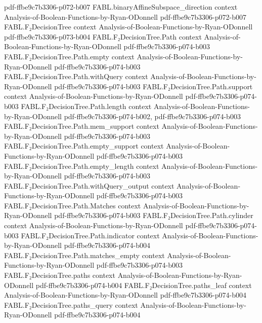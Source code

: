 \begin{theorem}
  {pdf-ffbe9c7b3306-p072-b007}
\proofstep
  {FABL.binaryAffineSubspace_direction}
  {context}
  {Analysis-of-Boolean-Functions-by-Ryan-ODonnell}
  {pdf-ffbe9c7b3306-p072-b007}
\proofstep
  {FABL.F₂DecisionTree}
  {context}
  {Analysis-of-Boolean-Functions-by-Ryan-ODonnell}
  {pdf-ffbe9c7b3306-p073-b004}
\proofstep
  {FABL.F₂DecisionTree.Path}
  {context}
  {Analysis-of-Boolean-Functions-by-Ryan-ODonnell}
  {pdf-ffbe9c7b3306-p074-b003}
\proofstep
  {FABL.F₂DecisionTree.Path.empty}
  {context}
  {Analysis-of-Boolean-Functions-by-Ryan-ODonnell}
  {pdf-ffbe9c7b3306-p074-b003}
\proofstep
  {FABL.F₂DecisionTree.Path.withQuery}
  {context}
  {Analysis-of-Boolean-Functions-by-Ryan-ODonnell}
  {pdf-ffbe9c7b3306-p074-b003}
\proofstep
  {FABL.F₂DecisionTree.Path.support}
  {context}
  {Analysis-of-Boolean-Functions-by-Ryan-ODonnell}
  {pdf-ffbe9c7b3306-p074-b003}
\proofstep
  {FABL.F₂DecisionTree.Path.length}
  {context}
  {Analysis-of-Boolean-Functions-by-Ryan-ODonnell}
  {pdf-ffbe9c7b3306-p074-b002,
    pdf-ffbe9c7b3306-p074-b003}
\proofstep
  {FABL.F₂DecisionTree.Path.mem_support}
  {context}
  {Analysis-of-Boolean-Functions-by-Ryan-ODonnell}
  {pdf-ffbe9c7b3306-p074-b003}
\proofstep
  {FABL.F₂DecisionTree.Path.empty_support}
  {context}
  {Analysis-of-Boolean-Functions-by-Ryan-ODonnell}
  {pdf-ffbe9c7b3306-p074-b003}
\proofstep
  {FABL.F₂DecisionTree.Path.empty_length}
  {context}
  {Analysis-of-Boolean-Functions-by-Ryan-ODonnell}
  {pdf-ffbe9c7b3306-p074-b003}
\proofstep
  {FABL.F₂DecisionTree.Path.withQuery_output}
  {context}
  {Analysis-of-Boolean-Functions-by-Ryan-ODonnell}
  {pdf-ffbe9c7b3306-p074-b003}
\proofstep
  {FABL.F₂DecisionTree.Path.Matches}
  {context}
  {Analysis-of-Boolean-Functions-by-Ryan-ODonnell}
  {pdf-ffbe9c7b3306-p074-b003}
\proofstep
  {FABL.F₂DecisionTree.Path.cylinder}
  {context}
  {Analysis-of-Boolean-Functions-by-Ryan-ODonnell}
  {pdf-ffbe9c7b3306-p074-b003}
\proofstep
  {FABL.F₂DecisionTree.Path.indicator}
  {context}
  {Analysis-of-Boolean-Functions-by-Ryan-ODonnell}
  {pdf-ffbe9c7b3306-p074-b004}
\proofstep
  {FABL.F₂DecisionTree.Path.matches_empty}
  {context}
  {Analysis-of-Boolean-Functions-by-Ryan-ODonnell}
  {pdf-ffbe9c7b3306-p074-b003}
\proofstep
  {FABL.F₂DecisionTree.paths}
  {context}
  {Analysis-of-Boolean-Functions-by-Ryan-ODonnell}
  {pdf-ffbe9c7b3306-p074-b004}
\proofstep
  {FABL.F₂DecisionTree.paths_leaf}
  {context}
  {Analysis-of-Boolean-Functions-by-Ryan-ODonnell}
  {pdf-ffbe9c7b3306-p074-b004}
\proofstep
  {FABL.F₂DecisionTree.paths_query}
  {context}
  {Analysis-of-Boolean-Functions-by-Ryan-ODonnell}
  {pdf-ffbe9c7b3306-p074-b004}

\end{theorem}
